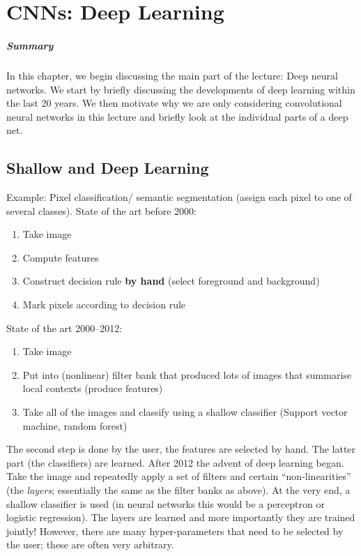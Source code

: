 \chapter{CNNs: Deep Learning}%
\label{chap:03}

\paragraph{Summary}
In this chapter, we begin discussing the main part of the lecture: Deep neural
networks. We start by briefly discussing the developments of deep learning
within the last 20 years. We then motivate why we are only considering
convolutional neural networks in this lecture and briefly look at the individual
parts of a deep net.

\section{Shallow and Deep Learning}
Example: Pixel classification/ semantic segmentation (assign each pixel to one
of several classes). State of the art before 2000:
\begin{enumerate}
\item Take image
\item Compute features
\item Construct decision rule \textbf{by hand} (\eg select foreground and
  background)
\item Mark pixels according to decision rule
\end{enumerate}

State of the art 2000--2012:
\begin{enumerate}
\item Take image
\item Put into (nonlinear) filter bank that produced lots of images that
  summarise local contexts (\ie produce features)
\item Take all of the images and classify using a shallow classifier (Support
  vector machine, random forest)
\end{enumerate}
The second step is done by the user, \ie the features are selected by hand. The
latter part (the classifiers) are learned. After 2012 the advent of deep
learning began. Take the image and repeatedly apply a set of filters and certain
``non-linearities'' (the \emph{layers}; essentially the same as the filter banks
as above). At the very end, a shallow classifier is used (in neural networks
this would be a perceptron or logistic regression). The layers are learned and
more importantly they are trained jointly! However, there are many
hyper-parameters that need to be selected by the user; these are often very
arbitrary.

